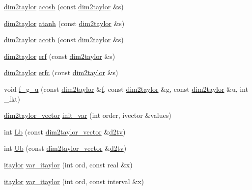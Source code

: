 \begin{DoxyCompactItemize}
\item 
\hyperlink{classtaylor_1_1dim2taylor}{dim2taylor} \hyperlink{namespacetaylor_a9f1462a458f207377ed02a451a36ff1f}{acosh} (const \hyperlink{classtaylor_1_1dim2taylor}{dim2taylor} \&s)
\item 
\hyperlink{classtaylor_1_1dim2taylor}{dim2taylor} \hyperlink{namespacetaylor_ad1aa16e085966399831df0b1718a7e89}{atanh} (const \hyperlink{classtaylor_1_1dim2taylor}{dim2taylor} \&s)
\item 
\hyperlink{classtaylor_1_1dim2taylor}{dim2taylor} \hyperlink{namespacetaylor_a9af34046db505e67a68ae0d5d279c253}{acoth} (const \hyperlink{classtaylor_1_1dim2taylor}{dim2taylor} \&s)
\item 
\hyperlink{classtaylor_1_1dim2taylor}{dim2taylor} \hyperlink{namespacetaylor_ac58758459f916c91fbadcdb56c22c543}{erf} (const \hyperlink{classtaylor_1_1dim2taylor}{dim2taylor} \&s)
\item 
\hyperlink{classtaylor_1_1dim2taylor}{dim2taylor} \hyperlink{namespacetaylor_a7ba8a01793192f1b63febdb1dd9e3da0}{erfc} (const \hyperlink{classtaylor_1_1dim2taylor}{dim2taylor} \&s)
\item 
void \hyperlink{namespacetaylor_aa89cea38f6aff7d86e21c6b63c526e3c}{f\-\_\-g\-\_\-u} (const \hyperlink{classtaylor_1_1dim2taylor}{dim2taylor} \&\hyperlink{errorfunc_8hpp_aacb77b1211a6ca2e2beff1811cf9ecf4}{f}, const \hyperlink{classtaylor_1_1dim2taylor}{dim2taylor} \&g, const \hyperlink{classtaylor_1_1dim2taylor}{dim2taylor} \&u, int \-\_\-fkt)
\item 
\hyperlink{classtaylor_1_1dim2taylor__vector}{dim2taylor\-\_\-vector} \hyperlink{namespacetaylor_ac56dff7aa717d97652479e90f605ab2e}{init\-\_\-var} (int order, ivector \&values)
\item 
int \hyperlink{namespacetaylor_a2bb1593763f084acddd2e1a1e1efaa11}{\-Lb} (const \hyperlink{classtaylor_1_1dim2taylor__vector}{dim2taylor\-\_\-vector} \&\hyperlink{errorfunc_8hpp_a40f7b267e7bca7091a0d4b941ebe3495}{d2tv})
\item 
int \hyperlink{namespacetaylor_a38b201904beee95d9528b9d656430c07}{\-Ub} (const \hyperlink{classtaylor_1_1dim2taylor__vector}{dim2taylor\-\_\-vector} \&\hyperlink{errorfunc_8hpp_a40f7b267e7bca7091a0d4b941ebe3495}{d2tv})
\item 
\hyperlink{classtaylor_1_1itaylor}{itaylor} \hyperlink{namespacetaylor_a6e77b6cb75729b58b05e3b3c5709aefc}{var\-\_\-itaylor} (int ord, const real \&x)
\item 
\hyperlink{classtaylor_1_1itaylor}{itaylor} \hyperlink{namespacetaylor_a44a70c367b1b6a794db51766b92e6199}{var\-\_\-itaylor} (int ord, const interval \&x)

\end{DoxyCompactItemize}
